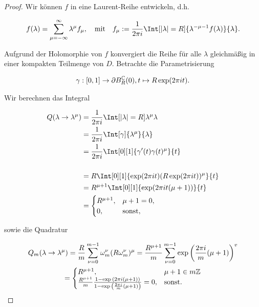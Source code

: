 \begin{proof}

    Wir können $f$ in eine Laurent-Reihe entwickeln, d.h.

    \begin{align*}
        f(\lambda) = \sum_{\mu = - \infty}^\infty \lambda^\mu f_\mu,
        \quad
        \text{mit}
        \quad
        f_\mu := \frac{1}{2\pi i} \Int[|\lambda| = R]{\lambda^{-\mu - 1} f(\lambda)}{\lambda}.
    \end{align*}

    Aufgrund der Holomorphie von $f$ konvergiert die Reihe für alle $\lambda$ gleichmäßig in einer kompakten Teilmenge von $D$.
    Betrachte die Parametrisierung

    \begin{align*}
        \gamma:
        [0,1] \to \partial B_R^{\mathbb{C}}(0),
        t \mapsto R\exp(2\pi i t).
    \end{align*}

    Wir berechnen das Integral

    \begin{align*}
        Q(\lambda \to \lambda^\mu)
        & =
        \frac{1}{2 \pi i}
        \Int[\abs{\lambda} = R]{\lambda^\mu}{\lambda} \\
        & =
        \frac{1}{2 \pi i}
        \Int[\gamma]{\lambda^\mu}{\lambda} \\
        & =
        \frac{1}{2 \pi i}
        \Int[0][1]{\gamma^\prime(t) \gamma(t)^\mu}{t} \\ \\
        & =
        R
        \Int[0][1]{\exp(2 \pi i t)(R \exp(2 \pi i t))^\mu}{t} \\
        & =
        R^{\mu + 1}
        \Int[0][1]{\exp(2\pi i t(\mu + 1))}{t} \\
        & =
        \begin{cases}
            R^{\mu + 1}, & \mu + 1 = 0, \\
            0,           & \text{sonst},
        \end{cases}
    \end{align*}

    sowie die Quadratur

    \begin{multline*}
        Q_m(\lambda \to \lambda^\mu)
        =
        \frac{R}{m}
        \sum_{\nu = 0}^{m - 1}
            \omega_m^\nu (R \omega_m^\nu)^\mu
        =
        \frac{R^{\mu + 1}}{m}
        \sum_{\nu = 0}^{m - 1}
            \exp {\left ( \frac{2\pi i}{m}(\mu + 1) \right )}^v \\
        =
        \begin{cases}
            R^{\mu + 1},
            & \mu + 1 \in m \mathbb{Z} \\
            \frac{R^{\mu + 1}}{m}
            \frac
            {
                1 - \exp {\left ( 2 \pi i(\mu + 1) \right )}
            }{
                1 - \exp {\left ( \frac{2\pi i}{m}(\mu + 1) \right )}
            }
            =
            0,
            & \text{sonst}.
        \end{cases}
    \end{multline*}
    

\end{proof}

